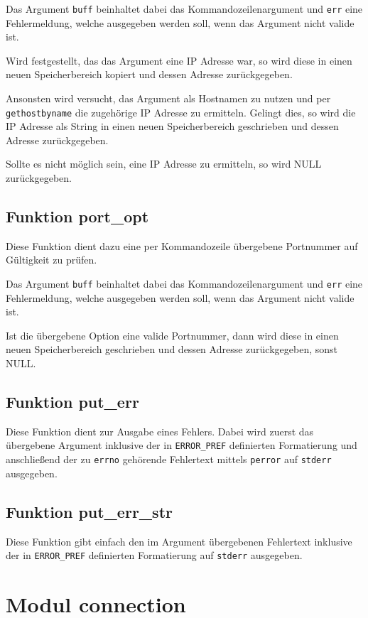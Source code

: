 \documentclass[pdftex,final,a4paper,10pt,notitlepage,halfparskip]{scrreprt}
\begin{document}
Das Argument \texttt{buff} beinhaltet dabei das Kommandozeilenargument und \texttt{err} eine Fehlermeldung, welche ausgegeben werden soll, wenn das Argument nicht valide ist.

Wird festgestellt, das das Argument eine IP Adresse war, so wird diese in einen neuen Speicherbereich kopiert und dessen Adresse zurückgegeben.

Ansonsten wird versucht, das Argument als Hostnamen zu nutzen und per \texttt{gethostbyname} die zugehörige IP Adresse zu ermitteln. Gelingt dies, so wird die IP Adresse als String in einen neuen Speicherbereich geschrieben und dessen Adresse zurückgegeben.

Sollte es nicht möglich sein, eine IP Adresse zu ermitteln, so wird NULL zurückgegeben.
\subsection{Funktion port\_opt}\label{fn:port_opt}
Diese Funktion dient dazu eine per Kommandozeile übergebene Portnummer auf Gültigkeit zu prüfen.

Das Argument \texttt{buff} beinhaltet dabei das Kommandozeilenargument und \texttt{err} eine Fehlermeldung, welche ausgegeben werden soll, wenn das Argument nicht valide ist.

Ist die übergebene Option eine valide Portnummer, dann wird diese in einen neuen Speicherbereich geschrieben und dessen Adresse zurückgegeben, sonst NULL.

\subsection{Funktion put\_err}\label{fn:put_err}
Diese Funktion dient zur Ausgabe eines Fehlers. Dabei wird zuerst das übergebene Argument inklusive der in \texttt{ERROR\_PREF} definierten Formatierung und anschließend der zu \texttt{errno} gehörende Fehlertext mittels \texttt{perror} auf \texttt{stderr} ausgegeben.

\subsection{Funktion put\_err\_str}\label{fn:put_err_str}
Diese Funktion gibt einfach den im Argument übergebenen Fehlertext inklusive der in \texttt{ERROR\_PREF} definierten Formatierung auf \texttt{stderr} ausgegeben.

\section{Modul connection}\label{mod:connection}
\end{document}
